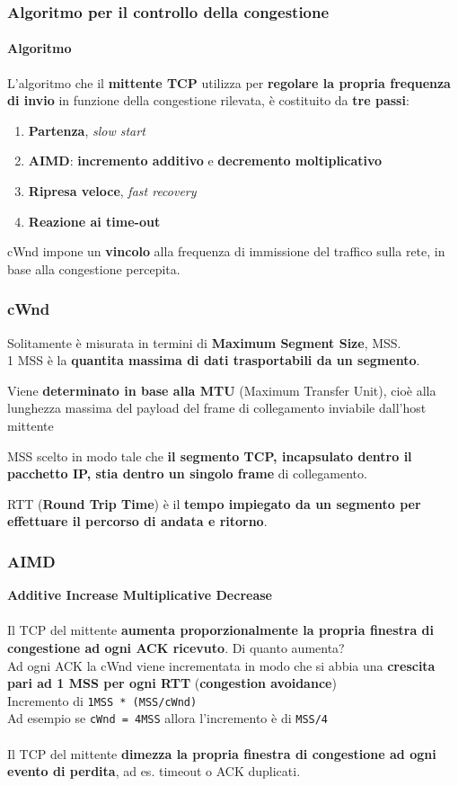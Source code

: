 \documentclass[10pt]{article}
\begin{document}
\subsubsection{Algoritmo per il controllo della congestione}
\paragraph{Algoritmo} L'algoritmo che il \textbf{mittente TCP} utilizza per \textbf{regolare la propria frequenza di invio} in funzione della congestione rilevata, è costituito da \textbf{tre passi}:
\begin{enumerate}
\item \textbf{Partenza}, \textit{slow start}
\item \textbf{AIMD}: \textbf{incremento additivo} e \textbf{decremento moltiplicativo}
\item \textbf{Ripresa veloce}, \textit{fast recovery}
\item \textbf{Reazione ai time-out}
\end{enumerate}
cWnd impone un \textbf{vincolo} alla frequenza di immissione del traffico sulla rete, in base alla congestione percepita.
\subsubsection{cWnd}
Solitamente è misurata in termini di \textbf{Maximum Segment Size}, MSS.\\
1 MSS è la \textbf{quantita massima di dati trasportabili da un segmento}.
\begin{list}{}{}
\item Viene \textbf{determinato in base alla MTU} (Maximum Transfer Unit), cioè alla lunghezza massima del payload del frame di collegamento inviabile dall'host mittente
\item MSS scelto in modo tale che \textbf{il segmento TCP, incapsulato dentro il pacchetto IP, stia dentro un singolo frame} di collegamento.
\end{list}
RTT (\textbf{Round Trip Time}) è il \textbf{tempo impiegato da un segmento per effettuare il percorso di andata e ritorno}.
\subsubsection{AIMD}
\textbf{Additive Increase Multiplicative Decrease}\\\\
Il TCP del mittente \textbf{aumenta proporzionalmente la propria finestra di congestione ad ogni ACK ricevuto}. Di quanto aumenta?\\
Ad ogni ACK la cWnd viene incrementata in modo che si abbia una \textbf{crescita pari ad 1 MSS per ogni RTT} (\textbf{congestion avoidance})\\
Incremento di \texttt{1MSS * (MSS/cWnd)}\\
Ad esempio se \texttt{cWnd = 4MSS} allora l'incremento è di \texttt{MSS/4}\\\\
Il TCP del mittente \textbf{dimezza la propria finestra di congestione ad ogni evento di perdita}, ad es. timeout o ACK duplicati.\\
\end{document}
